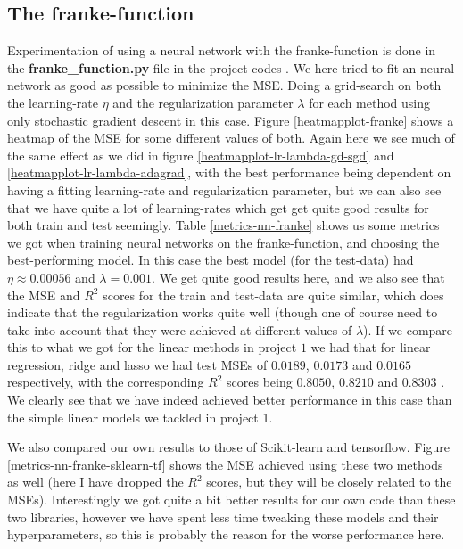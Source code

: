 \documentclass{article}
\begin{document}
\subsection{The franke-function}
Experimentation of using a neural network with the franke-function is done
in the \textbf{franke\_function.py} file in the project codes
\cite{githubrepoproject2code}. We here tried to fit an neural network as good as
possible to minimize the MSE. Doing a grid-search on both the learning-rate
$\eta$ and the regularization parameter $\lambda$ for each method using only
stochastic gradient descent in this case. Figure \ref{heatmapplot-franke} shows
a heatmap of the MSE for some different values of both. Again here we see much
of the same effect as we did in figure \ref{heatmapplot-lr-lambda-gd-sgd} and
\ref{heatmapplot-lr-lambda-adagrad}, with the best performance being dependent
on having a fitting learning-rate and regularization parameter, but we can also
see that we have quite a lot of learning-rates which get get quite good results
for both train and test seemingly. Table \ref{metrics-nn-franke} shows us some
metrics we got when training neural networks on the franke-function, and
choosing the best-performing model. In this case the best model (for the
test-data) had $\eta \approx 0.00056$ and $\lambda = 0.001$. We get quite good
results here, and we also see that the MSE and $R^2$ scores for the train and
test-data are quite similar, which does indicate that the regularization works
quite well (though one of course need to take into account that they were
achieved at different values of $\lambda$). If we compare this to what we got
for the linear methods in project $1$ we had that for linear regression, ridge
and lasso we had test MSEs of $0.0189$, $0.0173$ and $0.0165$ respectively, with
the corresponding $R^2$ scores being $0.8050$, $0.8210$ and $0.8303$
\cite[s.~4.1]{reportproject1}. We clearly see that we have indeed achieved
better performance in this case than the simple linear models we tackled in
project 1.

We also compared our own results to those of Scikit-learn and tensorflow. Figure
\ref{metrics-nn-franke-sklearn-tf} shows the MSE achieved using these two
methods as well (here I have dropped the $R^2$ scores, but they will be closely
related to the MSEs).  Interestingly we got quite a bit better results for our
own code than these two libraries, however we have spent less time tweaking these
models and their hyperparameters, so this is probably the reason for the worse
performance here.
\end{document}
